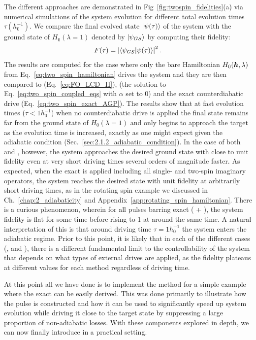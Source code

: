 The different approaches are demonstrated in Fig~\ref{fig:twospin_fidelities}(a) via numerical simulations of the system evolution for different total evolution times $\tau (h_0^{-1})$. We compare the final evolved state $\ket{\psi(\tau)}$ of the system with the ground state of $H_0(\lambda = 1)$ denoted by $\ket{\psi_{GS}}$ by computing their fidelity:
\begin{equation}
    F(\tau) = \left|\braket{\psi_{GS}}{\psi(\tau)}\right|^2.
\end{equation}
The results are computed for the case where only the bare Hamiltonian $H_0(\boldsymbol{h}, \lambda)$ from Eq.~\eqref{eq:two_spin_hamiltonian} drives the system and they are then compared to   (Eq.~\eqref{eq:FO_LCD_H}),   (the solution to Eq.~\eqref{eq:two_spin_coupled_eqs} with $\alpha$ set to $0$) and the exact counterdiabatic drive (Eq.~\eqref{eq:two_spin_exact_AGP}). The results show that at fast evolution times ($\tau < 1 h_0^{-1}$) when no counterdiabatic drive is applied the final state remains far from the ground state of $H_0(\lambda = 1)$ and only begins to approach the target as the evolution time is increased, exactly as one might expect given the adiabatic condition (Sec.~\ref{sec:2.1.2_adiabatic_condition}). In the case of both  and  , however, the system approaches the desired ground state with close to unit fidelity even at very short driving times several orders of magnitude faster. As expected, when the exact  is applied including all single- and two-spin imaginary operators, the system reaches the desired state with unit fidelity at arbitrarily short driving times, as in the rotating spin example we discussed in Ch.~\ref{chap:2_adiabaticity} and Appendix~\ref{app:rotating_spin_hamiltonian}. There is a curious phenomenon, wherein for all pulses barring exact  ( +  ), the system fidelity is flat for some time before rising to 1 at around the same time. A natural interpretation of this is that around driving time $\tau = 1 h_0^{-1}$ the system enters the adiabatic regime. Prior to this point, it is likely that in each of the different cases (,  and  ), there is a different fundamental limit to the controllability of the system that depends on what types of external drives are applied, as the fidelity plateaus at different values for each method regardless of driving time. 

At this point all we have done is to implement the  method for a simple example where the exact  can be easily derived. This was done primarily to illustrate how the  pulse is constructed and how it can be used to significantly speed up system evolution while driving it close to the target state by suppressing a large proportion of non-adiabatic losses. With these components explored in depth, we can now finally introduce  in a practical setting.

